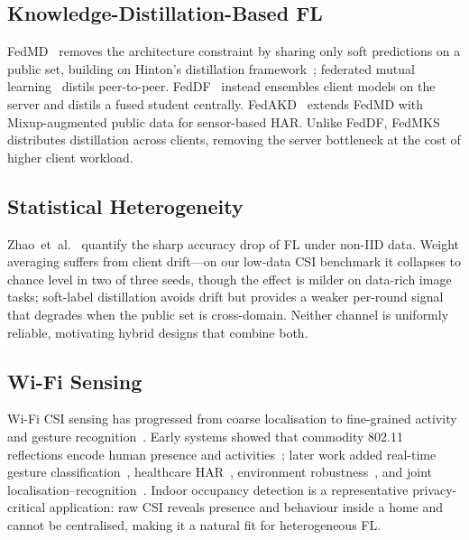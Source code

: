 \documentclass[conference]{IEEEtran}
\begin{document}
\subsection{Knowledge-Distillation-Based FL}

FedMD~\cite{li2019fedmd} removes the architecture constraint by sharing
only soft predictions on a public set, building on Hinton's distillation
framework~\cite{hinton2015distill}; federated mutual
learning~\cite{shen2020fedml} distils peer-to-peer.
FedDF~\cite{lin2020ensemble} instead ensembles client models on the
server and distils a fused student centrally.
FedAKD~\cite{gad2023fedakd} extends FedMD with Mixup-augmented public
data for sensor-based HAR.  Unlike FedDF, FedMKS
distributes distillation across clients, removing the server bottleneck
at the cost of higher client workload.

\subsection{Statistical Heterogeneity}

Zhao~et~al.~\cite{zhao2018noniid} quantify the sharp accuracy drop of
FL under non-IID data.  Weight averaging suffers from client drift---on
our low-data CSI benchmark it collapses to chance level in two of three
seeds, though the effect is milder on data-rich image tasks;
soft-label distillation avoids drift but provides a weaker
per-round signal that degrades when the public set is cross-domain.
Neither channel is uniformly reliable, motivating hybrid designs that
combine both.

\subsection{Wi-Fi Sensing}

Wi-Fi CSI sensing has progressed from coarse localisation to fine-grained
activity and gesture recognition~\cite{ma2019survey,yousefi2017survey}.
Early systems showed that commodity 802.11 reflections encode human
presence and activities~\cite{adib2013seewall,wang2014eyes}; later work
added real-time gesture classification~\cite{chen2018gesture},
healthcare HAR~\cite{han2020healthcare}, environment
robustness~\cite{jiang2021envind}, and joint
localisation--recognition~\cite{liu2020deepmtd}.  Indoor occupancy
detection is a representative privacy-critical application: raw CSI
reveals presence and behaviour inside a home and cannot be centralised,
making it a natural fit for heterogeneous FL.
\end{document}
